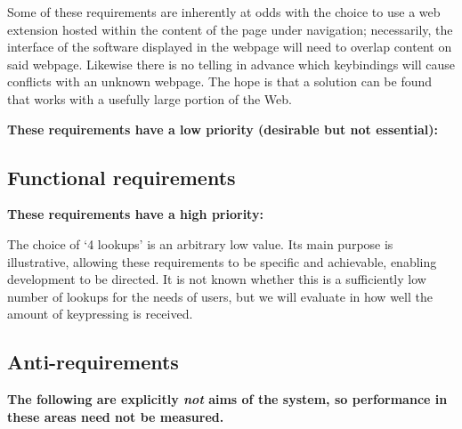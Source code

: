 \documentclass[11pt,openright,a4paper]{report}
\begin{document}
Some of these requirements are inherently at odds with the choice to use a web extension hosted within the content of the page under navigation; necessarily, the interface of the software displayed in the webpage will need to overlap content on said webpage.
Likewise there is no telling in advance which keybindings will cause conflicts with an unknown webpage. The hope is that a solution can be found that works with a usefully large portion of the Web.

\textbf{These requirements have a low priority (desirable but not essential):}
\reqstart
\reqend

\subsection{Functional requirements}

\textbf{These requirements have a high priority:}
\reqstart
\reqend

The choice of `4 lookups' is an arbitrary low value. Its main purpose is illustrative, allowing these requirements to be specific and achievable, enabling development to be directed. It is not known whether this is a sufficiently low number of lookups for the needs of users, but we will evaluate in  how well the amount of keypressing is received.

\subsection{Anti-requirements}
\label{sec:anti-req}
\textbf{The following are explicitly \textit{not} aims of the system, so performance in these areas need not be measured.}
\end{document}
